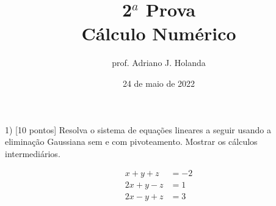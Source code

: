 \documentclass[11pt,a4paper]{article}
\begin{document}
\title{2$^a$ Prova \\ Cálculo Numérico}
\author{prof. Adriano J. Holanda}
\date{24 de maio de 2022}
\maketitle

1) [10 pontos] Resolva o sistema de equações lineares a seguir 
usando a eliminação Gaussiana sem e com pivoteamento.
Mostrar os cálculos intermediários.

\begin{align*}
	x  +y  +z & =  -2 \\
	2x  +y  -z & =  1  \\
	 2x  -y  +z & =  3
\end{align*}
\end{document}
